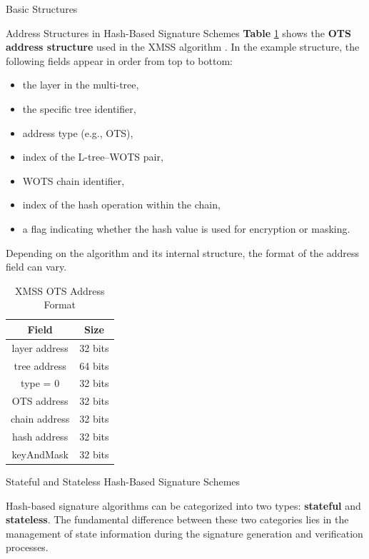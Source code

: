 \documentclass [version=submission]{iacrcc}
\begin{document}
\begin{section}{Basic Structures}{\label{sec1}}
\begin{subsection}{Address Structures in Hash-Based Signature Schemes}
\textbf{Table} \ref{tab: Adress} shows the \textbf{OTS address structure} used in the XMSS algorithm \cite{huelsing2018rfc}. In the example structure, the following fields appear in order from top to bottom:
\begin{itemize}
    \item the layer in the multi-tree,
    \item the specific tree identifier,
    \item address type (e.g., OTS),
    \item index of the L-tree–WOTS pair,
    \item WOTS chain identifier,
    \item index of the hash operation within the chain,
    \item a flag indicating whether the hash value is used for encryption or masking.
\end{itemize}

Depending on the algorithm and its internal structure, the format of the address field can vary.


\begin{table}[H]
\centering
\renewcommand{\arraystretch}{1.5}
\begin{tabular}{|c|c|}
\hline
\textbf{Field} & \textbf{Size} \\
\hline
layer address     & 32 bits \\
\hline
tree address      & 64 bits \\
\hline
type = 0          & 32 bits \\
\hline
OTS address       & 32 bits \\
\hline
chain address     & 32 bits \\
\hline
hash address      & 32 bits \\
\hline
keyAndMask        & 32 bits \\
\hline
\end{tabular}
\caption{XMSS OTS Address Format}
\label{tab: Adress}
\end{table}

\end{subsection}

\begin{subsection}{Stateful and Stateless Hash-Based Signature Schemes}

    Hash-based signature algorithms can be categorized into two types: \textbf{stateful} and \textbf{stateless}. The fundamental difference between these two categories lies in the management of state information during the signature generation and verification processes.


\end{subsection}
\end{section}
\end{document}
